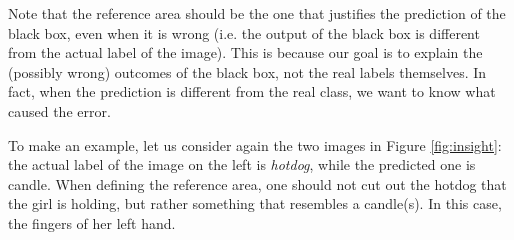 \documentclass[12pt, twoside, a4paper]{report}
\begin{document}
Note that the reference area should be the one that justifies the prediction of the black box, even when it is wrong (i.e. the output of the black box is different from the actual label of the image). This is because our goal is to explain the (possibly wrong) outcomes of the black box, not the real labels themselves. In fact, when the prediction is different from the real class, we want to know what caused the error. 

To make an example, let us consider again the two images in Figure \ref{fig:insight}: the actual label of the image on the left is \textit{hotdog}, while the predicted one is candle. When defining the reference area, one should not cut out the hotdog that the girl is holding, but rather something that resembles a candle(s). In this case, the fingers of her left hand.
\end{document}
